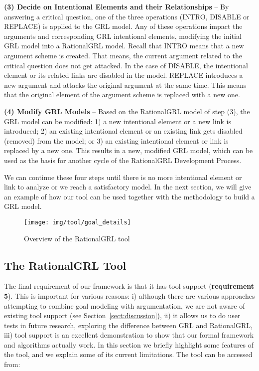 \textbf{(3) Decide on Intentional Elements and their Relationships} -- By answering a critical question, one of the three operations (\textsf{INTRO}, \textsf{DISABLE} or \textsf{REPLACE}) is applied to the GRL model. Any of these operations impact the arguments and corresponding GRL intentional elements, modifying the initial GRL model into a RationalGRL model. Recall that \textsf{INTRO} means that 
a new argument scheme is created. That means, the current argument related to the critical question does not get attacked.  In the case of \textsf{DISABLE}, the intentional element or its related links are disabled in the model. \textsf{REPLACE} introduces a new argument and attacks the original argument at the same time. This means that the original element of the argument scheme is replaced with a new one.   

\textbf{(4) Modify GRL Models} -- Based on the RationalGRL model of step (3), the GRL model can be modified: 1) a new intentional element or a new link is introduced; 2) an existing intentional element or an existing link gets disabled (removed) from the model; or 3) an existing intentional element or link is replaced by a new one. This results in a new, modified GRL model, which can be used as the basis for another cycle of the RationalGRL Development Process. 

We can continue these four steps until there is no more intentional element or link to analyze or we reach a satisfactory model. In the next section, we will give an example of how our tool can be used together with the methodology to build a GRL model.  

\begin{figure*}[t]
\centering
\texttt{[image: img/tool/goal\_details]}
\caption{Overview of the RationalGRL tool}
\label{fig:tool:overview}
\end{figure*}


\subsection{The RationalGRL Tool}
\label{sect:tool}

The final requirement of our framework is that it has tool support (\textbf{requirement 5}). This is important for various reasons: i) although there are various approaches attempting to combine goal modeling with argumentation, we are not aware of existing tool support (see Section~\ref{sect:discussion}), ii) it allows us to do user tests in future research, exploring the difference between GRL and RationalGRL, iii) tool support is an excellent demonstration to show that our formal framework and algorithms actually work. In this section we briefly highlight some features of the tool, and we explain some of its current limitations. The tool can be accessed from:

